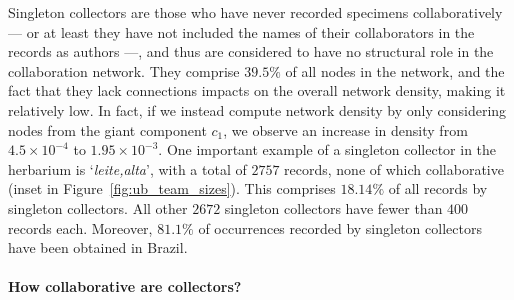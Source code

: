 Singleton collectors are those who have never recorded specimens collaboratively --- or at least they have not included the names of their collaborators in the records as authors ---, and thus are considered to have no structural role in the collaboration network.
They comprise $39.5\%$ of all nodes in the network, and the fact that they lack connections impacts on the overall network density, making it relatively low.
In fact, if we instead compute network density by only considering nodes from the giant component $c_1$, we observe an increase in density from $4.5 \times 10^{-4}$ to $1.95 \times 10^{-3}$. 
%
One important example of a singleton collector in the herbarium is `\textit{leite,alta}', with a total of $2757$ records, none of which collaborative (inset in Figure~\ref{fig:ub_team_sizes}).  %
This comprises $18.14\%$ of all records by singleton collectors.
All other $2672$ singleton collectors have fewer than $400$ records each.
Moreover, $81.1\%$ of occurrences recorded by singleton collectors have been obtained in Brazil.



\paragraph{How collaborative are collectors?}

